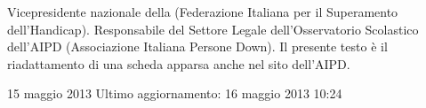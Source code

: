 Vicepresidente nazionale della   (Federazione Italiana per il Superamento dell'Handicap). Responsabile del Settore Legale dell'Osservatorio Scolastico dell'AIPD (Associazione Italiana Persone Down). Il presente testo è il riadattamento di una scheda apparsa anche nel sito dell’AIPD.

15 maggio 2013
Ultimo aggiornamento: 16 maggio 2013 10:24